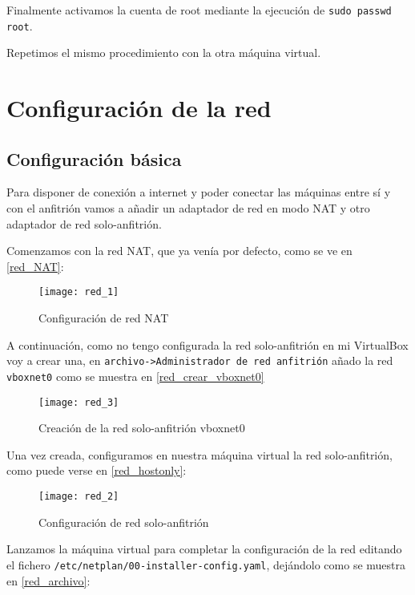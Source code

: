 Finalmente activamos la cuenta de root mediante la ejecución de \verb|sudo passwd root|.

Repetimos el mismo procedimiento con la otra máquina virtual.

\chapter{Configuración de la red}

\section{Configuración básica}

Para disponer de conexión a internet y poder conectar las máquinas entre sí y con el anfitrión vamos a añadir un adaptador de red en modo NAT y otro adaptador de red solo-anfitrión.

Comenzamos con la red NAT, que ya venía por defecto, como se ve en \eqref{red_NAT}:

\begin{figure}
\begin{center}
\caption{Configuración de red NAT}
\label{red_NAT}
\texttt{[image: red\_1]}
\end{center}
\end{figure}

A continuación, como no tengo configurada la red solo-anfitrión en mi VirtualBox voy a crear una, en \verb|archivo->Administrador de red anfitrión| añado la red \verb|vboxnet0| como se muestra en \eqref{red_crear_vboxnet0}

\begin{figure}
\begin{center}
\caption{Creación de la red solo-anfitrión vboxnet0}
\label{red_crear_vboxnet0}
\texttt{[image: red\_3]}
\end{center}
\end{figure}

Una vez creada, configuramos en nuestra máquina virtual la red solo-anfitrión, como puede verse en \eqref{red_hostonly}:

\begin{figure}
\begin{center}
\caption{Configuración de red solo-anfitrión}
\label{red_hostonly}
\texttt{[image: red\_2]}
\end{center}
\end{figure}

Lanzamos la máquina virtual para completar la configuración de la red editando el fichero \verb|/etc/netplan/00-installer-config.yaml|, dejándolo como se muestra en \eqref{red_archivo}:

